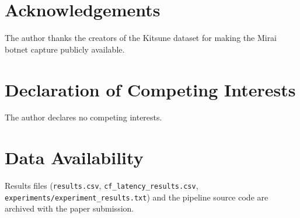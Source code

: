 \documentclass[preprint,12pt,authoryear]{elsarticle}
\begin{document}
\section*{Acknowledgements}
The author thanks the creators of the Kitsune dataset for making the Mirai
botnet capture publicly available.

\section*{Declaration of Competing Interests}
The author declares no competing interests.

\section*{Data Availability}
Results files (\texttt{results.csv}, \texttt{cf\_latency\_results.csv},
\texttt{experiments/experiment\_results.txt}) and the pipeline source code are
archived with the paper submission.



\end{document}
